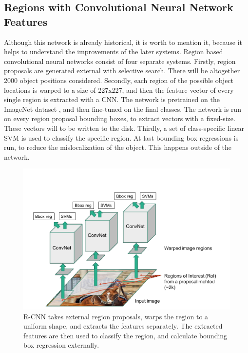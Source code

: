 \subsection{Regions with Convolutional Neural Network Features}
Although this network is already historical, it is worth to mention it, because it helps to understand the improvements of the later systems. Region based convolutional neural networks \cite{DBLP:journals/corr/GirshickDDM13} consist of four separate systems. Firstly, region proposals are generated external with selective search. There will be altogether 2000 object positions considered. Secondly, each region of the possible object locations is warped to a size of 227x227, and then the feature vector of every single region is extracted with a CNN. The network is pretrained on the ImageNet dataset \cite{NIPS2012_4824}, and then fine-tuned on the final classes. The network is run on every region proposal bounding boxes, to extract vectors with a fixed-size. These vectors will to be written to the disk. Thirdly, a set of class-specific linear SVM is used to classify the specific region. At last bounding box regressions is run, to reduce the mislocalization of the object. This happens outside of the network.
\begin{figure}[h!]
	\centering
	\includegraphics[width=12cm]{images/mt/rcnn.png}
	\caption{R-CNN takes external region proposals, warps the region to a uniform shape, and extracts the features separately. The extracted features are then used to classify the region, and calculate bounding box regression externally.}
	\label{fig:rcnn}
\end{figure}

